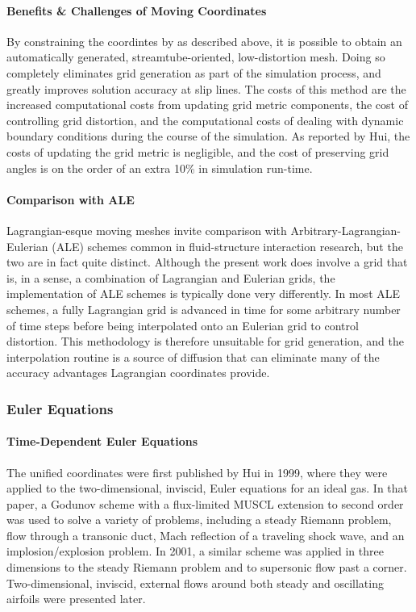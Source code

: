 \documentclass[12pt,letterpaper]{article}
\begin{document}
\paragraph{Benefits \& Challenges of Moving Coordinates}
By constraining the coordintes by as described above, 
it is possible to obtain an automatically
generated, streamtube-oriented, low-distortion mesh. Doing so
completely eliminates grid generation as part of the simulation
process, and greatly improves solution accuracy at slip lines. The
costs of this method are the increased computational costs from
updating grid metric components, the cost of controlling grid
distortion, and the computational costs of dealing with dynamic
boundary conditions 
during the course of the simulation. As reported
by Hui\cite{hui99}, the costs of updating the grid metric is
negligible, and the cost of preserving grid angles is on the order of
an extra 10\% in simulation run-time. 

\paragraph{Comparison with ALE}
Lagrangian-esque moving meshes invite comparison with
Arbitrary-Lagrangian-Eulerian (ALE) schemes common in fluid-structure
interaction research, but the two are in fact quite distinct. Although
the present work does involve a grid that is, in a sense, a
combination of Lagrangian and Eulerian grids, the implementation of
ALE schemes is typically done very differently. In most ALE schemes, a
fully Lagrangian grid is advanced in time for some arbitrary number of
time steps before being interpolated onto an Eulerian grid to control
distortion. This methodology is therefore unsuitable for grid
generation, and the interpolation routine is a source of diffusion
that can eliminate many of the accuracy advantages Lagrangian
coordinates provide.

\subsubsection{Euler Equations}
\paragraph{Time-Dependent Euler Equations}
The unified coordinates were first published by
Hui\cite{hui99} in 1999, 
where they were applied to the two-dimensional, 
inviscid, Euler equations for an ideal gas. In that paper, a Godunov 
scheme with a flux-limited MUSCL extension to second order was used 
to solve a variety of problems, including a steady Riemann problem, 
flow through a transonic duct, Mach reflection of a traveling shock 
wave, and an implosion/explosion problem. In 2001\cite{hui01}, a 
similar scheme was applied in three dimensions to the steady Riemann 
problem and to supersonic flow past a corner. Two-dimensional, 
inviscid, external flows around both steady and oscillating airfoils 
were presented later\cite{huigridless}. 
\end{document}
